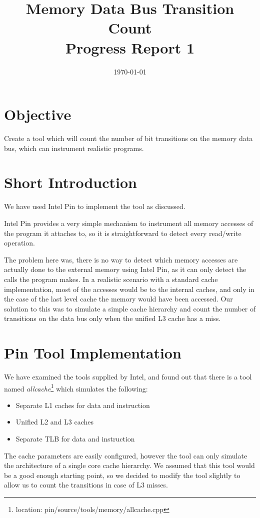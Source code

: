 \documentclass[a4paper,12pt]{article}
\title{Memory Data Bus Transition Count \\ Progress Report 1}
\date{\today}
\begin{document}
\fancyhf{}
\pagestyle{fancy}
\cfoot{\thepage}
\renewcommand{\headrulewidth}{0pt}
\renewcommand{\footrulewidth}{0.4pt}


\section{Objective}
Create a tool which will count the number of bit transitions on the memory data bus, which can instrument realistic programs.

\section{Short Introduction}
We have used Intel Pin to implement the tool as discussed.

Intel Pin provides a very simple mechanism to instrument all memory accesses of the program it attaches to, so it is straightforward to detect every read/write operation.

The problem here was, there is no way to detect which memory accesses are actually done to the external memory using Intel Pin, as it can only detect the calls the program makes. In a realistic scenario with a standard cache implementation, most of the accesses would be to the internal caches, and only in the case of the last level cache the memory would have been accessed. Our solution to this was to simulate a simple cache hierarchy and count the number of transitions on the data bus only when the unified L3 cache has a miss. 

\section{Pin Tool Implementation}
We have examined the tools supplied by Intel, and found out that there is a tool named \emph{allcache}\footnote{location: pin/source/tools/memory/allcache.cpp} which simulates the following:
\begin{itemize}
\item Separate L1 caches for data and instruction
\item Unified L2 and L3 caches
\item Separate TLB for data and instruction
\end{itemize}

The cache parameters are easily configured, however the tool can only simulate the architecture of a single core cache hierarchy. We assumed that this tool would be a good enough starting point, so we decided to modify the tool slightly to allow us to count the transitions in case of L3 misses. 
\end{document}
